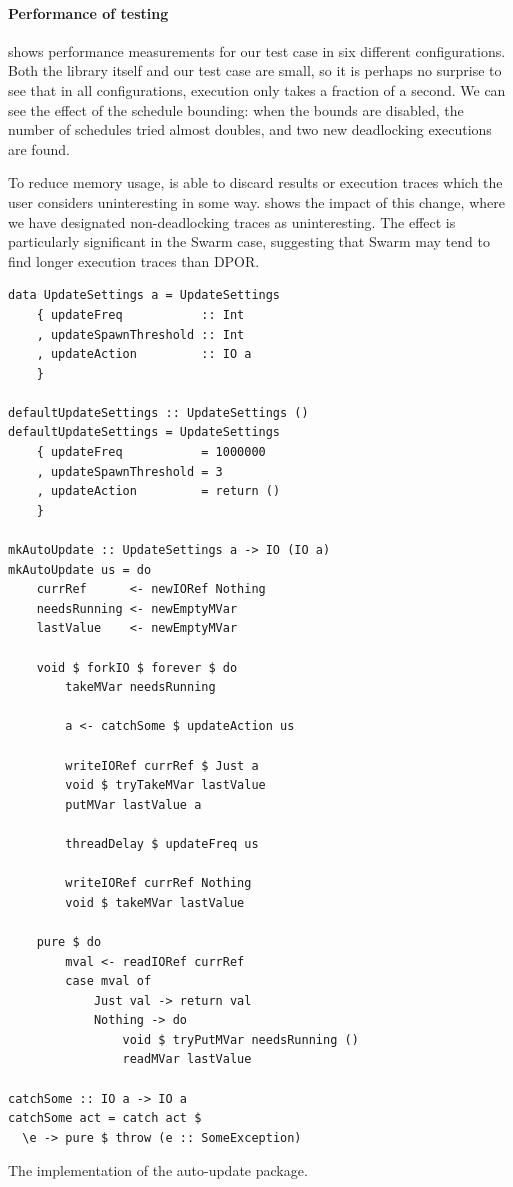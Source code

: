 \paragraph{Performance of testing}
 shows performance measurements for our test
case in six different configurations.  Both the library itself and our
test case are small, so it is perhaps no surprise to see that in all
configurations, execution only takes a fraction of a second.  We can
see the effect of the schedule bounding: when the bounds are disabled,
the number of schedules tried almost doubles, and two new deadlocking
executions are found.

To reduce memory usage, \dejafu{} is able to discard results or
execution traces which the user considers uninteresting in some way.
 shows the impact of this change, where we
have designated non-deadlocking traces as uninteresting.  The effect
is particularly significant in the Swarm case, suggesting that Swarm
may tend to find longer execution traces than DPOR.

\begin{listing}
  \centering
  \begin{minipage}{0.5\textwidth}
  \begin{verbatim}
data UpdateSettings a = UpdateSettings
    { updateFreq           :: Int
    , updateSpawnThreshold :: Int
    , updateAction         :: IO a
    }

defaultUpdateSettings :: UpdateSettings ()
defaultUpdateSettings = UpdateSettings
    { updateFreq           = 1000000
    , updateSpawnThreshold = 3
    , updateAction         = return ()
    }

mkAutoUpdate :: UpdateSettings a -> IO (IO a)
mkAutoUpdate us = do
    currRef      <- newIORef Nothing
    needsRunning <- newEmptyMVar
    lastValue    <- newEmptyMVar

    void $ forkIO $ forever $ do
        takeMVar needsRunning

        a <- catchSome $ updateAction us

        writeIORef currRef $ Just a
        void $ tryTakeMVar lastValue
        putMVar lastValue a

        threadDelay $ updateFreq us

        writeIORef currRef Nothing
        void $ takeMVar lastValue

    pure $ do
        mval <- readIORef currRef
        case mval of
            Just val -> return val
            Nothing -> do
                void $ tryPutMVar needsRunning ()
                readMVar lastValue

catchSome :: IO a -> IO a
catchSome act = catch act $
  \e -> pure $ throw (e :: SomeException)
  \end{verbatim}
  \end{minipage}
  \caption{The implementation of the auto-update package.}\label{lst:autoupdate}
\end{listing}

